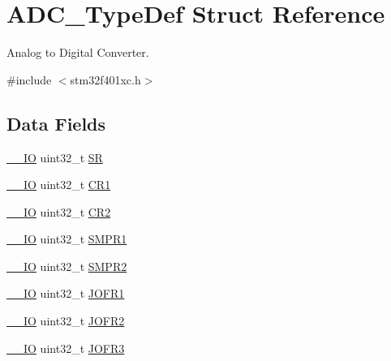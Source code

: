\hypertarget{struct_a_d_c___type_def}{}\section{A\+D\+C\+\_\+\+Type\+Def Struct Reference}
\label{struct_a_d_c___type_def}


Analog to Digital Converter.  




{\ttfamily \#include $<$stm32f401xc.\+h$>$}

\subsection*{Data Fields}
\begin{DoxyCompactItemize}
\item 
\hyperlink{core__sc300_8h_aec43007d9998a0a0e01faede4133d6be}{\+\_\+\+\_\+\+IO} uint32\+\_\+t \hyperlink{struct_a_d_c___type_def_af6aca2bbd40c0fb6df7c3aebe224a360}{SR}
\item 
\hyperlink{core__sc300_8h_aec43007d9998a0a0e01faede4133d6be}{\+\_\+\+\_\+\+IO} uint32\+\_\+t \hyperlink{struct_a_d_c___type_def_ab0ec7102960640751d44e92ddac994f0}{C\+R1}
\item 
\hyperlink{core__sc300_8h_aec43007d9998a0a0e01faede4133d6be}{\+\_\+\+\_\+\+IO} uint32\+\_\+t \hyperlink{struct_a_d_c___type_def_afdfa307571967afb1d97943e982b6586}{C\+R2}
\item 
\hyperlink{core__sc300_8h_aec43007d9998a0a0e01faede4133d6be}{\+\_\+\+\_\+\+IO} uint32\+\_\+t \hyperlink{struct_a_d_c___type_def_af9d6c604e365c7d9d7601bf4ef373498}{S\+M\+P\+R1}
\item 
\hyperlink{core__sc300_8h_aec43007d9998a0a0e01faede4133d6be}{\+\_\+\+\_\+\+IO} uint32\+\_\+t \hyperlink{struct_a_d_c___type_def_a6ac83fae8377c7b7fcae50fa4211b0e8}{S\+M\+P\+R2}
\item 
\hyperlink{core__sc300_8h_aec43007d9998a0a0e01faede4133d6be}{\+\_\+\+\_\+\+IO} uint32\+\_\+t \hyperlink{struct_a_d_c___type_def_a427dda1678f254bd98b1f321d7194a3b}{J\+O\+F\+R1}
\item 
\hyperlink{core__sc300_8h_aec43007d9998a0a0e01faede4133d6be}{\+\_\+\+\_\+\+IO} uint32\+\_\+t \hyperlink{struct_a_d_c___type_def_a11e65074b9f06b48c17cdfa5bea9f125}{J\+O\+F\+R2}
\item 
\hyperlink{core__sc300_8h_aec43007d9998a0a0e01faede4133d6be}{\+\_\+\+\_\+\+IO} uint32\+\_\+t \hyperlink{struct_a_d_c___type_def_a613f6b76d20c1a513976b920ecd7f4f8}{J\+O\+F\+R3}

\end{DoxyCompactItemize}
